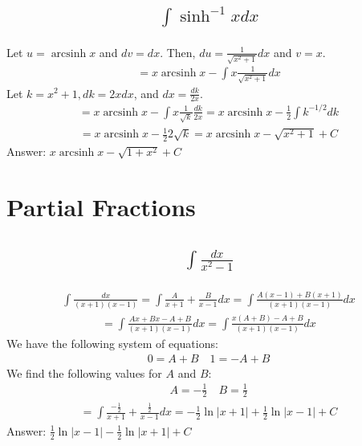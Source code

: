 \documentclass{article}
\DeclareMathOperator{\arcsinh}{arcsinh}
\begin{document}
\subsection{
	\begin{align*}
		\int{\sinh^{-1} x dx}
	\end{align*}
}
Let $u = \arcsinh{x}$ and $dv = dx$. Then, $du = \frac{1}{\sqrt{x^2 + 1}}dx$ and $v = x$.
\begin{align*}
	= x\arcsinh{x} - \int{x \frac{1}{\sqrt{x^2 + 1}}dx}
\end{align*}
Let $k = x^2 + 1, dk = 2xdx$, and $dx = \frac{dk}{2x}$. 
\begin{align*}
	= x\arcsinh{x} - \int{x \frac{1}{\sqrt{k}} \frac{dk}{2x}} = x\arcsinh{x} - \frac{1}{2}\int{k^{-1/2}dk}
\end{align*}
\begin{align*}
	= x\arcsinh{x} - \frac{1}{2} 2\sqrt{k} = x\arcsinh{x} - \sqrt{x^2 + 1} + C
\end{align*}
Answer: $x \arcsinh{x} - \sqrt{1 + x^2} + C$

\section{Partial Fractions}
\subsection{
	\begin{align*}
		\int{\frac{dx}{x^2 - 1}}
	\end{align*}
}
\begin{align*}
	\int{\frac{dx}{(x + 1)(x - 1)}} = \int{\frac{A}{x + 1} + \frac{B}{x - 1}dx} = \int{\frac{A(x - 1) + B(x + 1)}{(x + 1)(x - 1)}dx} 
\end{align*}
\begin{align*}
	= \int{\frac{Ax + Bx - A + B}{(x + 1)(x - 1)}dx} = \int{\frac{x(A + B) - A + B}{(x + 1)(x - 1)}dx}
\end{align*}
We have the following system of equations:
\begin{align*}
	0 = A + B \quad 1 = -A + B
\end{align*}
We find the following values for $A$ and $B$:
\begin{align*}
	A = -\frac{1}{2} \quad B = \frac{1}{2}
\end{align*}
\begin{align*}
	= \int{\frac{-\frac{1}{2}}{x + 1} + \frac{\frac{1}{2}}{x - 1}dx} = -\frac{1}{2} \ln{|x + 1|} + \frac{1}{2} \ln{|x - 1|} + C
\end{align*}
Answer: $\frac{1}{2} \ln{|x - 1|} - \frac{1}{2} \ln{|x + 1|} + C$
\end{document}

